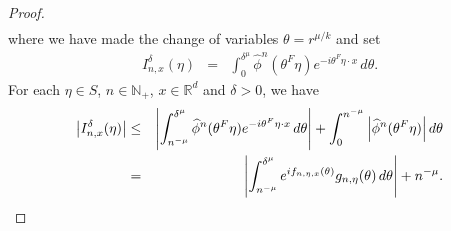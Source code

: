 \documentclass[11pt]{article}
\begin{document}
\begin{proof}
\begin{eqnarray*}
\end{eqnarray*}
where we have made the change of variables $\theta=r^{\mu/ k}$ and set
\begin{eqnarray*}
    I^\delta_{n,x}(\eta)&=&\int_0^{\delta^{\mu}}\widehat{\phi}^n(\theta^F\eta)e^{-i\theta^F\eta\cdot x}\,d\theta.
\end{eqnarray*}
For each $\eta\in S$, $n\in\mathbb{N}_+$, $x\in\mathbb{R}^d$ and $\delta>0$, we have
\begin{eqnarray*}
\abs{I_{n,x}^\delta(\eta)}
&\leq & 
\abs{\int_{n^{-\mu}}^{\delta^{\mu}}\widehat{\phi}^n(\theta^F\eta)e^{-i\theta^F\eta\cdot x}\,d\theta} +\int_{0}^{n^{-\mu}}\abs{\widehat{\phi}^n(\theta^F\eta)}\,d\theta\\
&=&
\abs{\int_{n^{-\mu}}^{\delta^\mu} e^{i f_{n,\eta,x}(\theta) } g_{n,\eta}(\theta)\,d\theta} 
+ n^{-\mu}.
\end{eqnarray*}

\end{proof}
\end{document}

